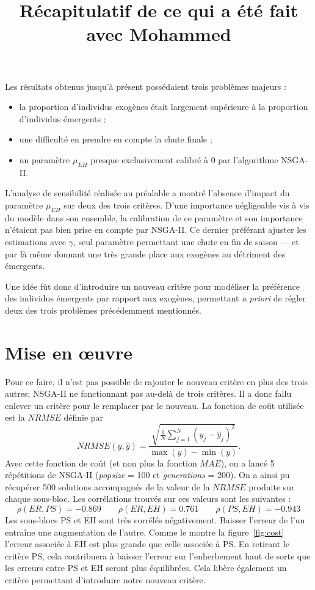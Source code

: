 \documentclass[a4paper, 11pt]{article}
\title{Récapitulatif de ce qui a été fait avec Mohammed}
\author{}
\date{}
\begin{document}
\maketitle

Les résultats obtenus jusqu'à présent possédaient trois problèmes majeurs :
\begin{itemize}
 \item la proportion d'individus exogènes était largement supérieure à la proportion d'individus émergents ;
 \item une difficulté en prendre en compte la chute finale ;
 \item un paramètre $\mu_{EH}$ presque exclusivement calibré à 0 par l'algorithme NSGA-II.
\end{itemize}
L'analyse de sensibilité réalisée au préalable a montré l'absence d'impact du paramètre $\mu_{EH}$ sur deux des trois critères. D'une importance négligeable vis à vis du modèle dans son ensemble, la calibration de ce paramètre et son importance n'étaient pas bien prise en compte par NSGA-II. Ce dernier préférant ajuster les estimations avec $\gamma$, seul paramètre permettant une chute en fin de saison --- et par là même donnant une très grande place aux exogènes au détriment des émergents.

Une idée fût donc d'introduire un nouveau critère pour modéliser la préférence des individus émergents par rapport aux exogènes, permettant \textit{a priori} de régler deux des trois problèmes précédemment mentionnés.


\section{Mise en œuvre}

Pour ce faire, il n'est pas possible de rajouter le nouveau critère en plus des trois autres; NSGA-II ne fonctionnant pas au-delà de trois critères. Il a donc fallu enlever un critère pour le remplacer par le nouveau. La fonction de coût utilisée est la $NRMSE$ définie par
$$
NRMSE(y, \hat y) = \frac{\sqrt{\frac{1}{N} \sum_{j=1}^N \left( y_j -\hat y_j \right)^2 }}{\max(y) - \min(y)}.
$$
Avec cette fonction de coût (et non plus la fonction $MAE$), on a lancé 5 répétitions de NSGA-II (\emph{popsize} = 100 et \emph{generations} = 200). On a ainsi pu récupérer 500 solutions accompagnés de la valeur de la $NRMSE$ produite sur chaque sous-bloc. Les corrélations trouvés sur ces valeurs sont les suivantes :
$$
\rho\left( ER, PS \right) = -0.869 \qquad \rho\left( ER, EH \right) = 0.761 \qquad \rho\left(PS, EH \right) = -0.943
$$
Les sous-blocs PS et EH sont très corrélés négativement. Baisser l'erreur de l'un entraîne une augmentation de l'autre. Comme le montre la figure~\ref{fig:cost} l'erreur associée à EH est plus grande que celle associée à PS. En retirant le critère PS, cela contribuera à baisser l'erreur sur l'enherbement haut de sorte que les erreurs entre PS et EH seront plus équilibrées. Cela libère également un critère permettant d'introduire notre nouveau critère.
\end{document}
